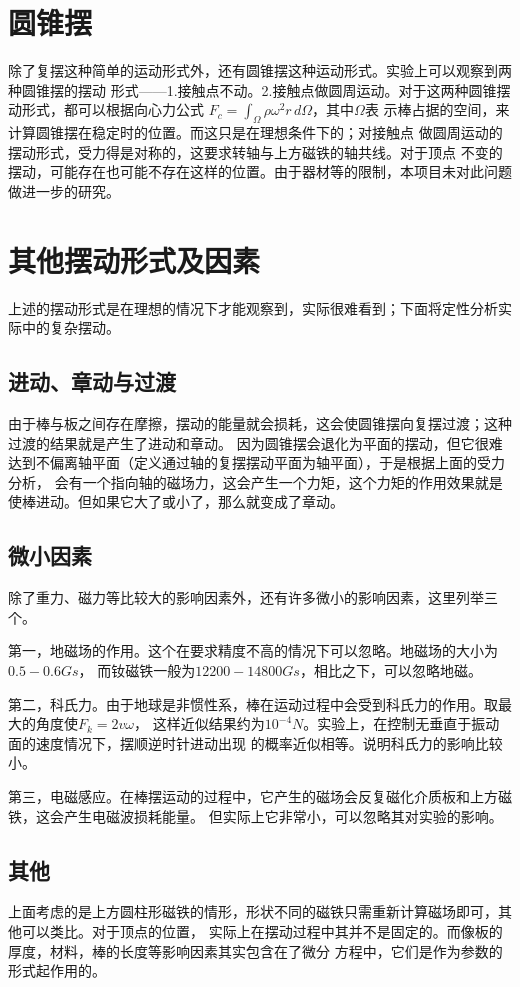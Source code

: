 \documentclass[AutoFakeBold]{LZUThesis}
\begin{document}
\section{圆锥摆}

除了复摆这种简单的运动形式外，还有圆锥摆这种运动形式。实验上可以观察到两种圆锥摆的摆动
形式——1.接触点不动。2.接触点做圆周运动。对于这两种圆锥摆动形式，都可以根据向心力公式
$F_c = \int_{\Omega} \rho\omega^2r \,d\Omega$，其中$\Omega$表
示棒占据的空间，来计算圆锥摆在稳定时的位置。而这只是在理想条件下的；对接触点
做圆周运动的摆动形式，受力得是对称的，这要求转轴与上方磁铁的轴共线。对于顶点
不变的摆动，可能存在也可能不存在这样的位置。由于器材等的限制，本项目未对此问题做进一步的研究。

\section{其他摆动形式及因素}
上述的摆动形式是在理想的情况下才能观察到，实际很难看到；下面将定性分析实际中的复杂摆动。

\subsection{进动、章动与过渡}
由于棒与板之间存在摩擦，摆动的能量就会损耗，这会使圆锥摆向复摆过渡；这种过渡的结果就是产生了进动和章动。
因为圆锥摆会退化为平面的摆动，但它很难达到不偏离轴平面（定义通过轴的复摆摆动平面为轴平面），于是根据上面的受力分析，
会有一个指向轴的磁场力，这会产生一个力矩，这个力矩的作用效果就是使棒进动。但如果它大了或小了，那么就变成了章动。

\subsection{微小因素}
除了重力、磁力等比较大的影响因素外，还有许多微小的影响因素，这里列举三个。

第一，地磁场的作用。这个在要求精度不高的情况下可以忽略。地磁场的大小为$0.5-0.6Gs$，
而钕磁铁一般为$12200-14800Gs$，相比之下，可以忽略地磁。

第二，科氏力。由于地球是非惯性系，棒在运动过程中会受到科氏力的作用。取最大的角度使$F_k = 2v\omega$，
这样近似结果约为$10^{-4}N$。实验上，在控制无垂直于振动面的速度情况下，摆顺逆时针进动出现
的概率近似相等。说明科氏力的影响比较小。

第三，电磁感应。在棒摆运动的过程中，它产生的磁场会反复磁化介质板和上方磁铁，这会产生电磁波损耗能量。
但实际上它非常小，可以忽略其对实验的影响。

\subsection{其他}
上面考虑的是上方圆柱形磁铁的情形，形状不同的磁铁只需重新计算磁场即可，其他可以类比。对于顶点的位置，
实际上在摆动过程中其并不是固定的。而像板的厚度，材料，棒的长度等影响因素其实包含在了微分
方程中，它们是作为参数的形式起作用的。
\end{document}
